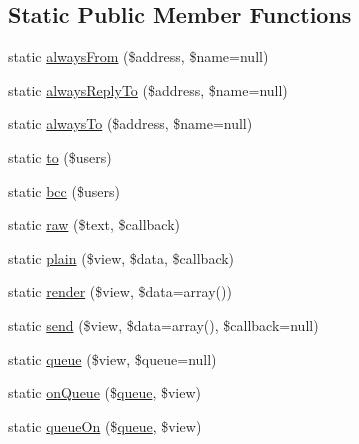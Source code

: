 \subsection*{Static Public Member Functions}
\begin{DoxyCompactItemize}
\item 
static \mbox{\hyperlink{class_illuminate_1_1_support_1_1_facades_1_1_mail_a24a500e68752fd86d4d2ad057431f3d7}{always\+From}} (\$address, \$name=null)
\item 
static \mbox{\hyperlink{class_illuminate_1_1_support_1_1_facades_1_1_mail_a65ebb2e9119b6764ebc06d7902759e68}{always\+Reply\+To}} (\$address, \$name=null)
\item 
static \mbox{\hyperlink{class_illuminate_1_1_support_1_1_facades_1_1_mail_a83714f3037e20389411b8274e3ed681a}{always\+To}} (\$address, \$name=null)
\item 
static \mbox{\hyperlink{class_illuminate_1_1_support_1_1_facades_1_1_mail_afbe8a912037dc180cfbd366144eb3a1f}{to}} (\$users)
\item 
static \mbox{\hyperlink{class_illuminate_1_1_support_1_1_facades_1_1_mail_a6bdd27b91af1bcea3fbf014dbd1127ef}{bcc}} (\$users)
\item 
static \mbox{\hyperlink{class_illuminate_1_1_support_1_1_facades_1_1_mail_a4dc9b81bde1bfd5b77ee735a6a09770d}{raw}} (\$text, \$callback)
\item 
static \mbox{\hyperlink{class_illuminate_1_1_support_1_1_facades_1_1_mail_ac99a987ce3f8cc915099da60b9fcaac4}{plain}} (\$view, \$data, \$callback)
\item 
static \mbox{\hyperlink{class_illuminate_1_1_support_1_1_facades_1_1_mail_a4f143bb75a63e5b82474608d754fce45}{render}} (\$view, \$data=array())
\item 
static \mbox{\hyperlink{class_illuminate_1_1_support_1_1_facades_1_1_mail_a700308972c34fae3fda5535834aa43de}{send}} (\$view, \$data=array(), \$callback=null)
\item 
static \mbox{\hyperlink{class_illuminate_1_1_support_1_1_facades_1_1_mail_a478836272e2433d16e0b02f850e146ac}{queue}} (\$view, \$queue=null)
\item 
static \mbox{\hyperlink{class_illuminate_1_1_support_1_1_facades_1_1_mail_a48e157639b1432f6bcc5e3a8ec2cd5e1}{on\+Queue}} (\$\mbox{\hyperlink{class_illuminate_1_1_support_1_1_facades_1_1_mail_a478836272e2433d16e0b02f850e146ac}{queue}}, \$view)
\item 
static \mbox{\hyperlink{class_illuminate_1_1_support_1_1_facades_1_1_mail_ae508af6b2c70a392a70ec240e43dad50}{queue\+On}} (\$\mbox{\hyperlink{class_illuminate_1_1_support_1_1_facades_1_1_mail_a478836272e2433d16e0b02f850e146ac}{queue}}, \$view)

\end{DoxyCompactItemize}
